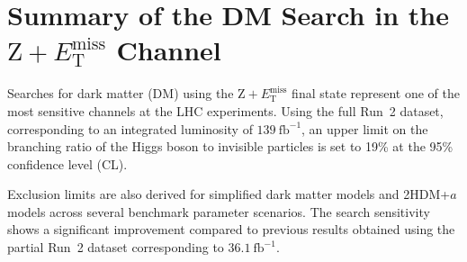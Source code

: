 \section{Summary of the DM Search in the $\text{Z} + E_{\text{T}}^{\text{miss}}$ Channel}

Searches for dark matter (DM) using the $\text{Z} + E_{\text{T}}^{\text{miss}}$ final state represent one of the most sensitive channels at the LHC experiments. 
Using the full Run~2 dataset, corresponding to an integrated luminosity of $139~\text{fb}^{-1}$, an upper limit on the branching ratio of the Higgs boson to invisible particles is set to 19\% at the 95\% confidence level (CL). 

Exclusion limits are also derived for simplified dark matter models and 2HDM+$a$ models across several benchmark parameter scenarios. 
The search sensitivity shows a significant improvement compared to previous results obtained using the partial Run~2 dataset corresponding to $36.1~\text{fb}^{-1}$.